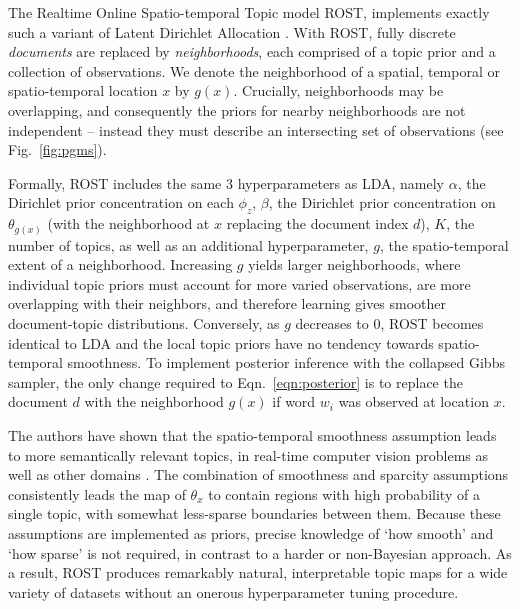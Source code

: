 The Realtime Online Spatio-temporal Topic model ROST, implements exactly such a variant of Latent Dirichlet Allocation \citep{Girdhar2014}. With ROST, fully discrete \emph{documents} are replaced by \emph{neighborhoods}, each comprised of a topic prior and a collection of observations. We denote the neighborhood of a spatial, temporal or spatio-temporal location $x$ by $g(x)$. Crucially, neighborhoods may be overlapping, and consequently the priors for nearby neighborhoods are not independent -- instead they must describe an intersecting set of observations (see Fig.~\ref{fig:pgms}).

Formally, ROST includes the same 3 hyperparameters as LDA, namely $\alpha$, the Dirichlet prior concentration on each $\phi_z$, $\beta$, the Dirichlet prior concentration on $\theta_{g(x)}$ (with the neighborhood at $x$ replacing the document index $d$), $K$, the number of topics, as well as an additional hyperparameter, $g$, the spatio-temporal extent of a neighborhood. Increasing $g$ yields larger neighborhoods, where individual topic priors must account for more varied observations, are more overlapping with their neighbors, and therefore learning gives smoother document-topic distributions. Conversely, as $g$ decreases to 0, ROST becomes identical to LDA and the local topic priors have no tendency towards spatio-temporal smoothness. To implement posterior inference with the collapsed Gibbs sampler, the only change required to Eqn.~\ref{eqn:posterior} is to replace the document $d$ with the neighborhood $g(x)$ if word $w_i$ was observed at location $x$.

The authors have shown that the spatio-temporal smoothness assumption leads to more semantically relevant topics, in real-time computer vision problems as well as other domains \citep{Girdhar2012, Girdhar2014a, Girdhar2016}. The combination of smoothness and sparcity assumptions consistently leads the map of $\theta_x$ to contain regions with high probability of a single topic, with somewhat less-sparse boundaries between them. Because these assumptions are implemented as priors, precise knowledge of `how smooth' and `how sparse' is not required, in contrast to a harder or non-Bayesian approach. As a result, ROST produces remarkably natural, interpretable topic maps for a wide variety of datasets without an onerous hyperparameter tuning procedure.

